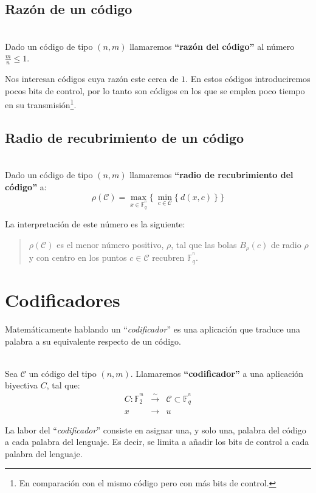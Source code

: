 \subsection{Raz\'on de un c\'odigo}

\begin{definicion}
\ \\
Dado un c\'odigo de tipo $(n,m)$ llamaremos \textbf{``raz\'on del c\'odigo''}
al n\'umero $\frac{m}{n}\leq 1$.
\end{definicion}
Nos interesan c\'odigos cuya raz\'on este cerca de $1$. En estos c\'odigos
introduciremos pocos bits de control, por lo tanto son c\'odigos en los que
se emplea poco tiempo en su transmisi\'on\footnote{En comparaci\'on con el
mismo c\'odigo pero con m\'as bits de control.}.

\subsection{Radio de recubrimiento de un c\'odigo}

\begin{definicion}
\ \\
Dado un c\'odigo de tipo $(n,m)$ llamaremos \textbf{``radio de recubrimiento del
c\'odigo''} a:
\begin{displaymath}
\rho (\mathcal{C}) = \max_{x\in \mathbb{F}^{^n}_q}\{\ \min_{c\in \mathcal{C}}
\{\ d(x,c)\ \}\ \} 
\end{displaymath}
\end{definicion}
La interpretaci\'on de este n\'umero es la siguiente:
\begin{quote}
$\rho(\mathcal{C})$ es el menor n\'umero positivo, $\rho$, tal que las bolas
$B_{\rho}(c)$ de radio $\rho$ y con centro en los puntos $c\in \mathcal{C}$
recubren $\mathbb{F}^{^n}_q$.
\end{quote}
\section{Codificadores}\label{sec:Codificadores}

Matem\'aticamente hablando un ``\emph{codificador}'' es una aplicaci\'on que
traduce una palabra a su equivalente respecto de un c\'odigo.
\begin{definicion}[Codificador]
\ \\
Sea $\mathcal{C}$ un c\'odigo del tipo $(n,m)$. Llamaremos
\textbf{``codificador''} a una aplicaci\'on biyectiva $C$, tal que:
\begin{eqnarray*}
C: \mathbb{F}^{^m}_2 &\stackrel{\sim}\longrightarrow& \mathcal{C}\subset \mathbb{F}^{^n}_q \\
 x &\longrightarrow & u
\end{eqnarray*}
\end{definicion}
La labor del ``\emph{codificador}'' consiste en asignar una, y solo una, palabra
del c\'odigo a cada palabra del lenguaje. Es decir, se limita a a\~nadir los
bits de control a cada palabra del lenguaje.\\

